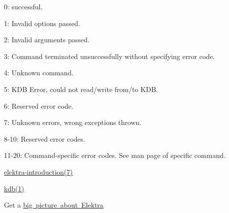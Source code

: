 \begin{DoxyItemize}
\item 0\+: successful.
\item 1\+: Invalid options passed.
\item 2\+: Invalid arguments passed.
\item 3\+: Command terminated unsuccessfully without specifying error code.
\item 4\+: Unknown command.
\item 5\+: K\+DB Error, could not read/write from/to K\+DB.
\item 6\+: Reserved error code.
\item 7\+: Unknown errors, wrong exceptions thrown.
\item 8-\/10\+: Reserved error codes.
\item 11-\/20\+: Command-\/specific error codes. See man page of specific command.
\end{DoxyItemize}


\begin{DoxyItemize}
\item \mbox{\hyperlink{doc_help_elektra-introduction_md}{elektra-\/introduction(7)}}
\item \mbox{\hyperlink{doc_help_kdb_md}{kdb(1)}}
\item Get a \mbox{\hyperlink{doc_BIGPICTURE_md}{big picture about Elektra}} 
\end{DoxyItemize}